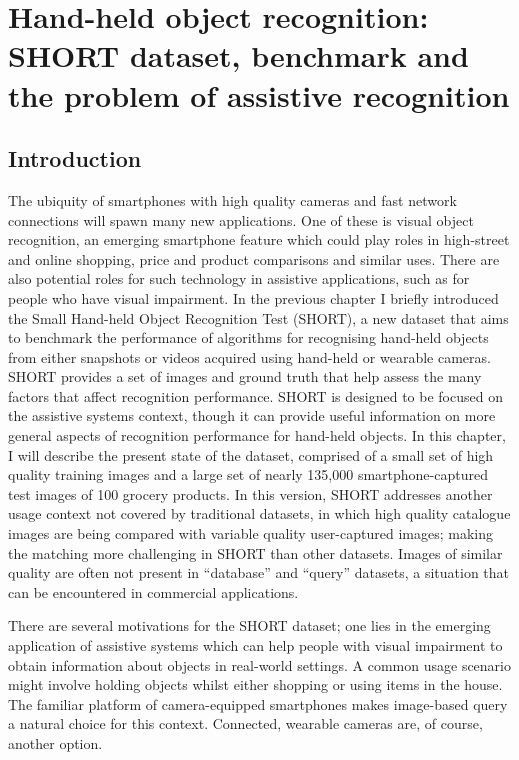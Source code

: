 \chapter{Hand-held object recognition: SHORT dataset, benchmark and the problem of assistive recognition}\label{ch:chapter3}


\section{Introduction}
\label{sec:intro}

The ubiquity of smartphones with high quality cameras and fast network connections will spawn many new applications. One of these is visual object recognition, an emerging smartphone feature which could play roles in high-street and online shopping, price and product comparisons and similar uses. There are also potential roles for such technology in assistive applications, such as for people who have visual impairment. In the previous chapter I briefly introduced the Small Hand\--held Object Re\-cog\-ni\-tion Test (SHORT), a new dataset that aims to benchmark the performance of algorithms for recognising hand-held objects from either snapshots or videos acquired using hand-held or wearable cameras. SHORT provides a set of images and ground truth that help assess the many factors that affect recognition performance. SHORT is designed to be focused on the assistive systems context, though it can provide useful information on more general aspects of recognition performance for hand-held objects. In this chapter, I will describe the present state of the dataset, comprised of a small set of high quality training images and a large set of nearly 135,000 smartphone-captured test images of 100 grocery products. In this version, SHORT addresses another usage context not covered by traditional datasets, in which high quality catalogue images are being compared with variable quality user-captured images; making the matching more challenging in SHORT than other datasets. Images of similar quality are often not present in ``database'' and ``query'' datasets, a situation that can be encountered in commercial applications. 

There are several motivations for the SHORT dataset; one lies in the emerging application of assistive systems which can help people with visual impairment to obtain information about objects in real-world settings. A common usage scenario might involve holding objects whilst either shopping or using items in the house. The familiar platform of camera-equipped smartphones makes image-based query a natural choice for this context. Connected, wearable cameras are, of course, another option.

